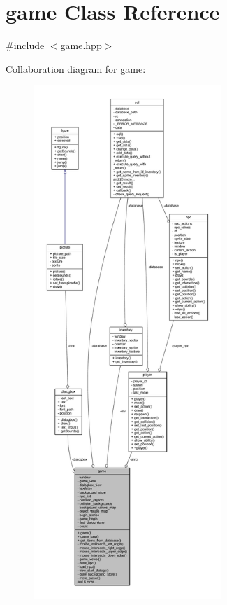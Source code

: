 \hypertarget{classgame}{}\section{game Class Reference}
\label{classgame}


{\ttfamily \#include $<$game.\+hpp$>$}



Collaboration diagram for game\+:
\nopagebreak
\begin{figure}[H]
\begin{center}
\leavevmode
\includegraphics[height=550pt]{classgame__coll__graph}
\end{center}
\end{figure}
